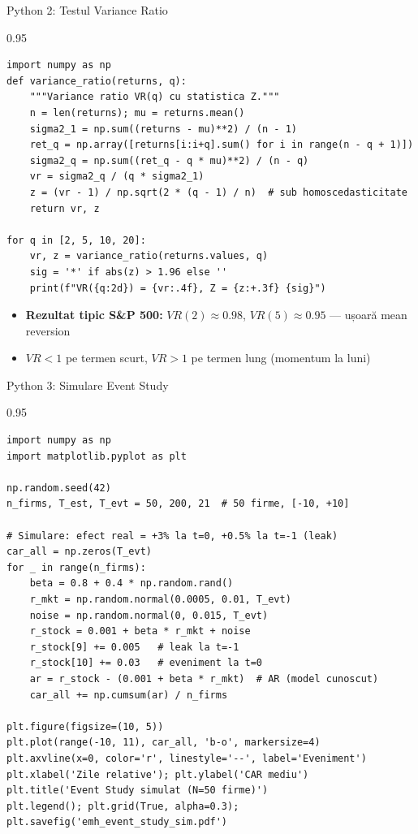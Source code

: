 \documentclass[9pt, aspectratio=169, t]{beamer}
\begin{document}
\begin{frame}[fragile]{Python 2: Testul Variance Ratio}
    \begin{cminipage}{0.95\textwidth}
\vspace{-2mm}
\begin{lstlisting}[basicstyle=\ttfamily\scriptsize]
import numpy as np
def variance_ratio(returns, q):
    """Variance ratio VR(q) cu statistica Z."""
    n = len(returns); mu = returns.mean()
    sigma2_1 = np.sum((returns - mu)**2) / (n - 1)
    ret_q = np.array([returns[i:i+q].sum() for i in range(n - q + 1)])
    sigma2_q = np.sum((ret_q - q * mu)**2) / (n - q)
    vr = sigma2_q / (q * sigma2_1)
    z = (vr - 1) / np.sqrt(2 * (q - 1) / n)  # sub homoscedasticitate
    return vr, z

for q in [2, 5, 10, 20]:
    vr, z = variance_ratio(returns.values, q)
    sig = '*' if abs(z) > 1.96 else ''
    print(f"VR({q:2d}) = {vr:.4f}, Z = {z:+.3f} {sig}")
\end{lstlisting}
\vspace{-2mm}
\begin{itemize}\setlength{\itemsep}{0pt}
    \item \textbf{Rezultat tipic S\&P 500:} $VR(2) \approx 0.98$, $VR(5) \approx 0.95$ --- ușoară mean reversion
    \item $VR < 1$ pe termen scurt, $VR > 1$ pe termen lung (momentum la luni)
\end{itemize}
\vspace{-1mm}
    \end{cminipage}
\end{frame}

\begin{frame}[fragile]{Python 3: Simulare Event Study}
    \begin{cminipage}{0.95\textwidth}
\begin{lstlisting}[basicstyle=\ttfamily\scriptsize]
import numpy as np
import matplotlib.pyplot as plt

np.random.seed(42)
n_firms, T_est, T_evt = 50, 200, 21  # 50 firme, [-10, +10]

# Simulare: efect real = +3% la t=0, +0.5% la t=-1 (leak)
car_all = np.zeros(T_evt)
for _ in range(n_firms):
    beta = 0.8 + 0.4 * np.random.rand()
    r_mkt = np.random.normal(0.0005, 0.01, T_evt)
    noise = np.random.normal(0, 0.015, T_evt)
    r_stock = 0.001 + beta * r_mkt + noise
    r_stock[9] += 0.005   # leak la t=-1
    r_stock[10] += 0.03   # eveniment la t=0
    ar = r_stock - (0.001 + beta * r_mkt)  # AR (model cunoscut)
    car_all += np.cumsum(ar) / n_firms

plt.figure(figsize=(10, 5))
plt.plot(range(-10, 11), car_all, 'b-o', markersize=4)
plt.axvline(x=0, color='r', linestyle='--', label='Eveniment')
plt.xlabel('Zile relative'); plt.ylabel('CAR mediu')
plt.title('Event Study simulat (N=50 firme)')
plt.legend(); plt.grid(True, alpha=0.3); plt.savefig('emh_event_study_sim.pdf')
\end{lstlisting}
    \end{cminipage}
\end{frame}
\end{document}
